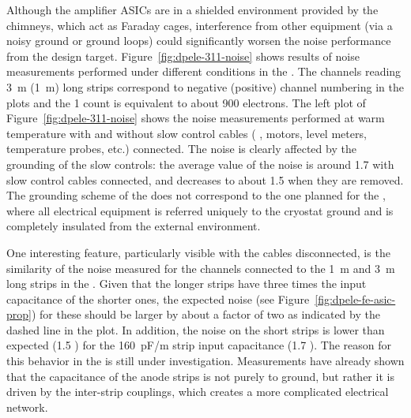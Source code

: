 Although the  amplifier ASICs are in a shielded environment provided by the chimneys, which act as Faraday cages,
interference from other equipment (via a noisy ground or ground loops) could significantly worsen the noise performance from the design target. Figure~\ref{fig:dpele-311-noise} shows %
results of %
noise measurements performed under different conditions in the . The channels reading \SI{3}{\meter} (\SI{1}{\metre}) long strips correspond to negative (positive) channel numbering in the plots and the \num{1}  count is equivalent to about \num{900} electrons. The left plot of Figure~\ref{fig:dpele-311-noise} shows the noise measurements performed at warm temperature with and without slow control cables ( ,  motors, level meters, temperature probes, etc.) connected. 
The noise is clearly affected by the grounding of the slow controls: the average value of the noise \rms is around \num{1.7}  with slow control cables connected, and decreases to about \num{1.5}  when they are removed. %
The grounding scheme of the  does not correspond to the one %
planned for the , where all electrical equipment is referred uniquely to the cryostat ground and is completely insulated from the external environment. 

One interesting feature, particularly visible with the cables disconnected, is %
the similarity of the noise measured for the channels connected to the \SI{1}{\meter} and \SI{3}{\meter} long strips in the . 
Given that the longer strips have %
three times the input capacitance of the shorter ones, the expected noise (see Figure~\ref{fig:dpele-fe-asic-prop}) for these should be larger by about a factor of two as indicated by the dashed line in the plot. In addition, the noise on the short strips is lower than expected (\num{1.5} ) for the \SI{160}{pF/m} strip input capacitance (\num{1.7} ). The reason for this behavior %
in the  is still under investigation. %
Measurements have already shown that the capacitance of the  anode strips is not purely to ground, but rather it is driven by the inter-strip couplings, which creates a more complicated electrical network. 

